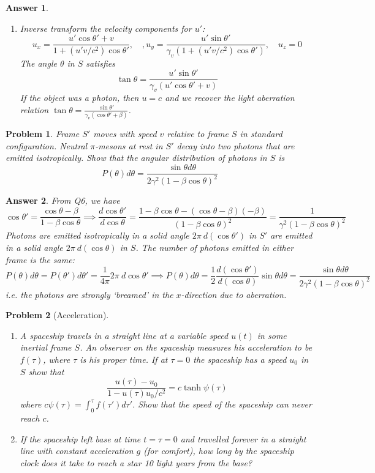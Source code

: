 \documentclass[a4paper]{article}
\newtheorem{ans}{Answer}[subsection]
\theoremstyle{new}
\newtheorem{qns}{Problem}[section]
\begin{document}
\begin{ans}
\begin{enumerate}[label=(\alph*)]
The back and the front both moves at speed $v$, as expected. Hence, we must have
$$\tan\theta=\frac{\ell_0\sin\theta'}{\ell_0\cos\theta'/\gamma}=\gamma\tan\theta'$$
\item Inverse transform the velocity components for $u'$:
$$u_x=\frac{u'\cos\theta'+v}{1+(u'v/c^2)\cos\theta'},\quad ,u_y=\frac{u'\sin\theta'}{\gamma_v(1+(u'v/c^2)\cos\theta')},\quad u_z=0$$
The angle $\theta$ in $S$ satisfies
$$\tan\theta=\frac{u'\sin\theta'}{\gamma_v(u'\cos\theta'+v)}$$
If the object was a photon, then $u=c$ and we recover the light aberration relation $\tan\theta=\frac{\sin\theta'}{\gamma_v(\cos\theta'+\beta)}$.
\end{enumerate}
\end{ans}
\begin{qns}
Frame $S'$ moves with speed $v$ relative to frame $S$ in standard configuration. Neutral $\pi$-mesons at rest in $S'$ decay into two photons that are emitted isotropically. Show that the angular distribution of photons in $S$ is
$$P(\theta)d\theta=\frac{\sin\theta d\theta}{2\gamma^2(1-\beta\cos\theta)^2}$$
\end{qns}
\begin{ans}
From Q6, we have 
$$\cos\theta'=\frac{\cos\theta-\beta}{1-\beta\cos\theta}\implies\frac{d\cos\theta'}{d\cos\theta}=\frac{1-\beta\cos\theta-(\cos\theta-\beta)(-\beta)}{(1-\beta\cos\theta)^2}=\frac{1}{\gamma^2(1-\beta\cos\theta)^2}$$
Photons are emitted isotropically in a solid angle $2\pi~ d(\cos\theta')$ in $S'$ are emitted in a solid angle $2\pi~d(\cos\theta)$ in $S$. The number of photons emitted in either frame is the same:
$$P(\theta)d\theta=P(\theta')d\theta'=\frac{1}{4\pi}2\pi~d\cos\theta'\implies P(\theta)d\theta=\frac{1}{2}\frac{d(\cos\theta')}{d(\cos\theta)}\sin\theta d\theta=\frac{\sin\theta d\theta}{2\gamma^2(1-\beta\cos\theta)^2}$$
i.e. the photons are strongly `breamed' in the $x$-direction due to aberration.
\end{ans}
\newpage
\begin{qns}[Acceleration]\leavevmode
\begin{enumerate}[label=(\alph*)]
\item A spaceship travels in a straight line at a variable speed $u(t)$ in some inertial frame $S$. An observer on the spaceship measures his acceleration to be $f(\tau)$, where $\tau$ is his proper time. If at $\tau=0$ the spaceship has a speed $u_0$ in $S$ show that
$$\frac{u(\tau)-u_0}{1-u(\tau)u_0/c^2}=c\tanh\psi(\tau)$$
where $c\psi(\tau)=\int_0^\tau f(\tau')d\tau'$. Show that the speed of the spaceship can never reach $c$.
\item If the spaceship left base at time $t=\tau=0$ and travelled forever in a straight line with constant acceleration $g$ (for comfort), how long by the spaceship clock does it take to reach a star 10 light years from the base?
\end{enumerate}
\end{qns}
\end{document}
